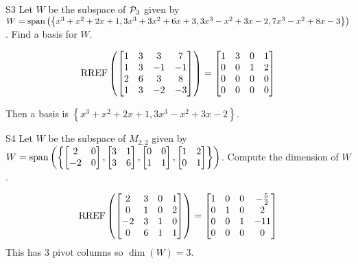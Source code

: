 \documentclass{sbgLAexam}
\begin{document}
\begin{extract}\newpage\end{extract}
\begin{problem}{S3}
Let $W$ be the subspace of $\P_3$ given by $W = {\rm span} \left( \left\{ x^3+x^2+2x+1, 3x^3+3x^2+6x+3, 3x^3-x^2+3x-2, 7x^3-x^2+8x-3 \right\} \right)$.  Find a basis for $W$.
\end{problem}
\begin{solution}
$$\RREF\left(\begin{bmatrix} 1 & 3 & 3 & 7 \\ 1 & 3 & -1 & -1 \\ 2 & 6 & 3 & 8 \\ 1 & 3 & -2 & -3 \end{bmatrix}\right) = \begin{bmatrix} 1 & 3 & 0 & 1 \\ 0 & 0 & 1 & 2 \\ 0 & 0 & 0 & 0 \\  0 & 0 & 0 & 0 \end{bmatrix}$$

Then a basis is 
$ \left\{ x^3+x^2+2x+1, 3x^3-x^2+3x-2 \right\} $.
\end{solution}


\begin{problem}{S4}  
Let $W$ be the subspace of $M_{2,2}$ given by $W={\rm span}\left(\left\{\begin{bmatrix} 2 & 0 \\ -2 & 0 \end{bmatrix}, \begin{bmatrix} 3 & 1 \\ 3 & 6 \end{bmatrix}, \begin{bmatrix} 0 & 0 \\ 1 & 1 \end{bmatrix}, \begin{bmatrix}1 & 2 \\ 0 & 1 \end{bmatrix}\right\}\right)$. Compute the dimension of $W$.
\end{problem}
\begin{solution}
$$\RREF\left( \begin{bmatrix} 2 & 3 & 0 & 1 \\ 0 & 1 & 0 & 2 \\ -2 & 3 & 1 & 0 \\ 0 & 6 & 1 & 1\end{bmatrix} \right) = \begin{bmatrix}1 & 0 & 0 & -\frac{5}{2} \\ 0 & 1 & 0 & 2 \\ 0 & 0 & 1 & -11\\ 0 & 0 & 0 & 0  \end{bmatrix} $$
This has 3 pivot columns so  $\dim(W) =3$.
\end{solution}
\end{document}
